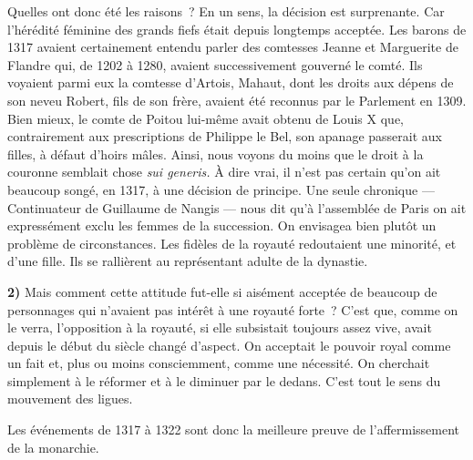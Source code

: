 \documentclass[french,twoside]{book} %
\newcommand{\labelchar}[1]{\textbf{\color{rubric} #1}}
\begin{document}
\label{p14} Quelles ont donc été les raisons ? En un sens, la décision est surprenante. Car l’hérédité féminine des grands fiefs était depuis longtemps acceptée. Les barons de 1317 avaient certainement entendu parler des comtesses Jeanne et Marguerite de Flandre qui, de 1202 à 1280, avaient successivement gouverné le comté. Ils voyaient parmi eux la comtesse d’Artois, Mahaut, dont les droits aux dépens de son neveu Robert, fils de son frère, avaient été reconnus par le Parlement en 1309. Bien mieux, le comte de Poitou lui-même avait obtenu de Louis X que, contrairement aux prescriptions de Philippe le Bel, son apanage passerait aux filles, à défaut d’hoirs mâles. Ainsi, nous voyons du moins que le droit à la couronne semblait chose {\itshape sui generis.} À dire vrai, il n’est pas certain qu’on ait beaucoup songé, en 1317, à une décision de principe. Une seule chronique — Continuateur de Guillaume de Nangis — nous dit qu’à l’assemblée de Paris on ait expressément exclu les femmes de la succession. On envisagea bien plutôt un problème de circonstances. Les fidèles de la royauté redoutaient une minorité, et d’une fille. Ils se rallièrent au représentant adulte de la dynastie.\par
\bigbreak
\noindent \labelchar{2)} Mais comment cette attitude fut-elle si aisément acceptée de beaucoup de personnages qui n’avaient pas intérêt à une royauté forte ? C’est que, comme on le verra, l’opposition à la royauté, si elle subsistait toujours assez vive, avait depuis le début du siècle changé d’aspect. On acceptait le pouvoir royal comme un fait et, plus ou moins consciemment, comme une nécessité. On cherchait simplement à le réformer et à le diminuer par le dedans. C’est tout le sens du mouvement des ligues.\par
Les événements de 1317 à 1322 sont donc la meilleure preuve de l’affermissement de la monarchie.
\end{document}
